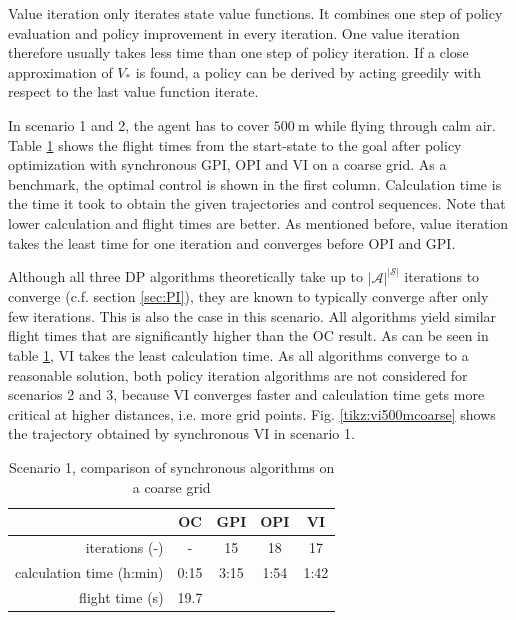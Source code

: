Value iteration only iterates state value functions. It combines one step of policy evaluation and policy improvement in every iteration. One value iteration therefore usually takes less time than one step of policy iteration. If a close approximation of $V_*$ is found, a policy can be derived by acting greedily with respect to the last value function iterate.

In scenario 1 and 2, the agent has to cover $500~\text{m}$ while flying through calm air. Table \ref{tab:2d_flight_data_500m} shows the flight times from the start-state to the goal after policy optimization with synchronous GPI, OPI and VI on a coarse grid. As a benchmark, the optimal control  is shown in the first column. Calculation time is the time it took to obtain the given trajectories and control sequences. Note that lower calculation and flight times are better. As mentioned before, value iteration takes the least time for one iteration and converges before OPI and GPI.

Although all three DP algorithms theoretically take up to $|\mathcal{A}|^{|\mathcal{S}|}$ iterations to converge (c.f. section \ref{sec:PI}), they are known to typically converge after only few iterations. This is also the case in this scenario. All algorithms yield similar flight times that are significantly higher than the OC result. As can be seen in table \ref{tab:2d_flight_data_500m}, VI takes the least calculation time. As all algorithms converge to a reasonable solution, both policy iteration algorithms are not considered for scenarios 2 and 3, because VI converges faster and calculation time gets more critical at higher distances, i.e. more grid points. Fig. \ref{tikz:vi500mcoarse} shows the trajectory obtained by synchronous VI in scenario 1.

\begin{table}[htb]
	\begin{center}
		\begin{tabular}{r|c c c c}
			 & OC & GPI & OPI & VI \\ \hline
			iterations (-) & - & 15 & 18 & 17 \\
			calculation time (h:min) & 0:15 & 3:15 & 1:54 & 1:42 \\
			flight time (s) & 19.7 & & &
		\end{tabular}
		\caption{Scenario 1, comparison of synchronous algorithms on a coarse grid}
		\label{tab:2d_flight_data_500m}
	\end{center}
\end{table}

